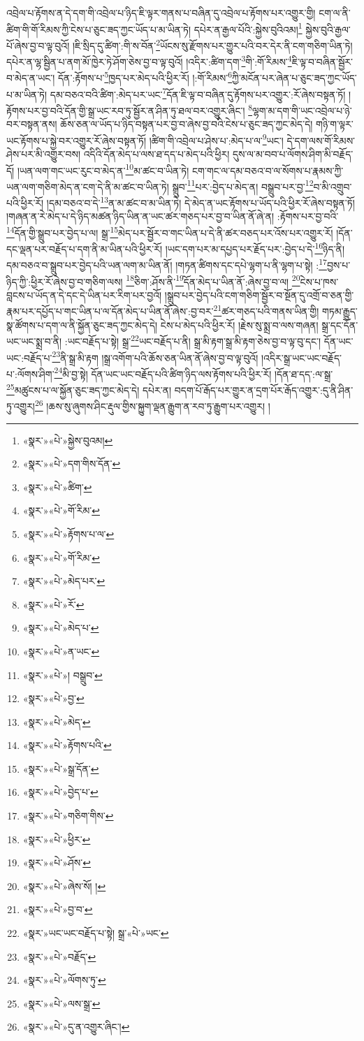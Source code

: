 འབྲེལ་པ་རྟོགས་ན་དེ་དག་གི་འབྲེལ་པ་ཉིད་ཇི་ལྟར་གནས་པ་བཞིན་དུ་འབྲེལ་པ་རྟོགས་པར་འགྱུར་གྱི། ངག་ལ་ནི་ཚིག་གི་གོ་རིམས་ཀྱི་ངེས་པ་ཅུང་ཟད་ཀྱང་ཡོད་པ་མ་ཡིན་ཏེ། དཔེར་ན་རྒྱལ་པོའི་:སྐྱེས་བུའིའམ།\footnote{«སྣར་»«པེ་»སྐྱེས་བུའམ།} སྐྱེས་བུའི་རྒྱལ་པོ་ཞེས་བྱ་བ་ལྟ་བུའོ། །ཇི་སྲིད་དུ་ཚིག་:གི་ས་བོན་\footnote{«སྣར་»«པེ་»དག་གིས་དོན་}ཡོངས་སུ་རྫོགས་པར་གྱུར་པའི་བར་དེར་ནི་ངག་གཅིག་ཡིན་ཏེ། དཔེར་ན་ལྷ་སྦྱིན་པ་ནག་མོ་ཁྱེར་ཏེ་ཤོག་ཅེས་བྱ་བ་ལྟ་བུའོ། །འདིར་:ཚིག་དག་\footnote{«སྣར་»«པེ་»ཚིག་}གི་:གོ་རིམས་\footnote{«སྣར་»«པེ་»གོ་རིམ་}ཇི་ལྟ་བ་བཞིན་སྦྱོར་བ་མེད་ན་ཡང་། དོན་:རྟོགས་པ་\footnote{«སྣར་»«པེ་»རྟོགས་པ་ལ་}ཁྱད་པར་མེད་པའི་ཕྱིར་རོ། །:གོ་རིམས་\footnote{«སྣར་»«པེ་»གོ་རིམ་}ཀྱི་མངོན་པར་ཞེན་པ་ཅུང་ཟད་ཀྱང་ཡོད་པ་མ་ཡིན་ཏེ། དམ་བཅའ་བའི་ཚིག་:མེད་པར་ཡང་\footnote{«སྣར་»«པེ་»མེད་པར་}དོན་ཇི་ལྟ་བ་བཞིན་དུ་རྟོགས་པར་འགྱུར་:རོ་ཞེས་བསྟན་ཏོ། །རྟོགས་པར་བྱ་བའི་དོན་གྱི་སྒྲ་ཡང་རབ་ཏུ་སྦྱོར་ན་ཤིན་ཏུ་ཐལ་བར་འགྱུར་ཞིང་། \footnote{«སྣར་»«པེ་»རོ་}ལྷག་མ་དག་གི་ཡང་འབྲེལ་པ་ཉེ་བར་བསྟན་ནས། ཆོས་ཅན་ལ་ཡོད་པ་ཉིད་བསྟན་པར་བྱ་བ་ཞེས་བྱ་བའི་ངེས་པ་ཅུང་ཟད་ཀྱང་མེད་དེ། གཉི་ག་ལྟར་ཡང་རྟོགས་པ་སྐྱེ་བར་འགྱུར་རོ་ཞེས་བསྟན་ཏོ། །ཚིག་གི་འབྲེལ་པ་ཤེས་པ་:མེད་པ་ལ་\footnote{«སྣར་»«པེ་»མེད་པ་}ཡང་། དེ་དག་ལས་གོ་རིམས་ཤེས་པར་མི་འགྱུར་བས། འདིའི་དོན་མེད་པ་ལས་ཐ་དད་པ་མེད་པའི་ཕྱིར། དུས་ལ་མ་བབ་པ་ལོགས་ཤིག་མི་བརྗོད་དོ། །ཡན་ལག་གང་ཡང་རུང་བ་མེད་ན་\footnote{«སྣར་»«པེ་»ན་ཡང་}མ་ཚང་བ་ཡིན་ཏེ། ངག་གང་ལ་དམ་བཅའ་བ་ལ་སོགས་པ་རྣམས་ཀྱི་ཡན་ལག་གཅིག་མེད་ན་ངག་དེ་ནི་མ་ཚང་བ་ཡིན་ཏེ། སྒྲུབ་\footnote{«སྣར་»«པེ་»།  བསྒྲུབ་}པར་:བྱེད་པ་མེད་ན། བསྒྲུབ་པར་བྱ་\footnote{«སྣར་»«པེ་»བྱ་}བ་མི་འགྲུབ་པའི་ཕྱིར་རོ། །དམ་བཅའ་བ་དེ་\footnote{«སྣར་»«པེ་»མེད་}ན་མ་ཚང་བ་མ་ཡིན་ཏེ། དེ་མེད་ན་ཡང་རྟོགས་པ་ཡོད་པའི་ཕྱིར་རོ་ཞེས་བསྟན་ཏོ། །གཞན་ན་རེ་མེད་པ་དེ་ཉིད་མཚན་ཉིད་ཡིན་ན་ཡང་ཚར་གཅད་པར་བྱ་བ་ཡིན་ནོ་ཞེ་ན། :རྟོགས་པར་བྱ་བའི་\footnote{«སྣར་»«པེ་»རྟོགས་པའི་}དོན་གྱི་སྒྲུབ་པར་བྱེད་པ་ལ། སྒྲ་\footnote{«སྣར་»«པེ་»སྒྲ་དོན་}མེད་པར་སྦྱོར་བ་གང་ཡིན་པ་དེ་ནི་ཚར་བཅད་པར་འོས་པར་འགྱུར་རོ། །དོན་དང་ལྡན་པར་བརྗོད་པ་དག་ནི་མ་ཡིན་པའི་ཕྱིར་རོ། །ཡང་དག་པར་མ་དཔྱད་པར་རྗོད་པར་:བྱེད་པ་དེ་\footnote{«སྣར་»«པེ་»བྱེད་པ་}ཉིད་ནི། དམ་བཅའ་བ་སྒྲུབ་པར་བྱེད་པའི་ཡན་ལག་མ་ཡིན་ནོ། །གཏན་ཚིགས་དང་དཔེ་ལྷག་པ་ནི་ལྷག་པ་སྟེ། :\footnote{«སྣར་»«པེ་»གཅིག་གིས་}བྱས་པ་ཉིད་ཀྱི་:ཕྱིར་རོ་ཞེས་བྱ་བ་གཅིག་ལས། \footnote{«སྣར་»«པེ་»ཕྱིར་}ཅིག་:ཤོས་ནི་\footnote{«སྣར་»«པེ་»ཤོས་}དོན་མེད་པ་ཡིན་ནོ་:ཞེས་བྱ་བ་ལ། \footnote{«སྣར་»«པེ་»ཞེས་སོ། ། }ངེས་པ་ཁས་བླངས་པ་ཡོད་ན་དེ་དང་དེ་ཡིན་པར་རིག་པར་བྱའོ། །སྒྲུབ་པར་བྱེད་པའི་ངག་གཅིག་སྦྱོར་བ་སྔོན་དུ་འགྲོ་བ་ཅན་གྱི་རྣམ་པར་དཔྱོད་པ་གང་ཡིན་པ་ལ་དོན་མེད་པ་ཡིན་ནོ་ཞེས་:བྱ་བར་\footnote{«སྣར་»«པེ་»བྱ་བ་}ཚར་གཅད་པའི་གནས་ཡིན་གྱི། གཏམ་རྒྱུད་སྣ་ཚོགས་པ་དག་ལ་ནི་སྐྱོན་ཅུང་ཟད་ཀྱང་མེད་དེ། ངེས་པ་མེད་པའི་ཕྱིར་རོ། །རྗེས་སུ་སྨྲ་བ་ལས་གཞན། སྒྲ་དང་དོན་ཡང་ཡང་སྨྲ་བ་ནི། :ཡང་བརྗོད་པ་སྟེ། སྒྲ་\footnote{«སྣར་»ཡང་ཡང་བརྗོད་པ་སྟེ། སྒྲ་«པེ་»ཡང་}ཡང་བརྗོད་པ་ནི། སྒྲ་མི་རྟག་སྒྲ་མི་རྟག་ཅེས་བྱ་བ་ལྟ་བུ་དང་། དོན་ཡང་ཡང་:བརྗོད་པ་\footnote{«སྣར་»«པེ་»བརྗོད་}ནི་སྒྲ་མི་རྟག །སྒྲ་འགོག་པའི་ཆོས་ཅན་ཡིན་ནོ་ཞེས་བྱ་བ་ལྟ་བུའོ། །འདིར་སྒྲ་ཡང་ཡང་བརྗོད་པ་:ལོགས་ཤིག་\footnote{«སྣར་»«པེ་»ལོགས་ཏུ་}མི་བྱ་སྟེ། དོན་ཡང་ཡང་བརྗོད་པའི་ཚིག་ཉིད་ལས་རྟོགས་པའི་ཕྱིར་རོ། །དོན་ཐ་དད་:ལ་སྒྲ་\footnote{«སྣར་»«པེ་»ལས་སྒྲ་}མཚུངས་པ་ལ་སྐྱོན་ཅུང་ཟད་ཀྱང་མེད་དེ། དཔེར་ན། བདག་པོ་རྒོད་པར་གྱུར་ན་དྲག་པོར་རྒོད་འགྱུར་:དུ་ནི་ཤིན་ཏུ་འགྱུར།\footnote{«སྣར་»«པེ་»དུ་ན་འགྱུར་ཞིང་།} །ཆས་སུ་ཞུགས་ཤིང་རྡུལ་གྱིས་སྐྱུག་ལྡན་རྒྱུག་ན་རབ་ཏུ་རྒྱུག་པར་འགྱུར། །
